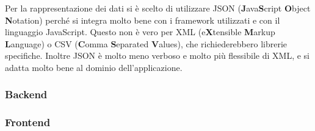 Per la rappresentazione dei dati si è scelto di utilizzare JSON (\textbf{J}ava\textbf{S}cript \textbf{O}bject \textbf{N}otation) perché si integra molto bene con i framework utilizzati e con il linguaggio JavaScript. Questo non è vero per XML (e\textbf{X}tensible \textbf{M}arkup \textbf{L}anguage) o CSV (\textbf{C}omma \textbf{S}eparated \textbf{V}alues), che richiederebbero librerie specifiche. Inoltre JSON è molto meno verboso e molto più flessibile di XML, e si adatta molto bene al dominio dell'applicazione.
\subsubsection{Backend}
\subsubsection{Frontend}
